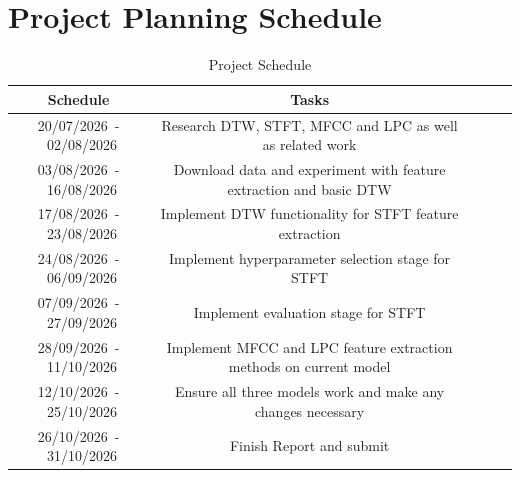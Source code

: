 \chapter{Project Planning Schedule}
\makeatletter{}\makeatother\label{appen:proj_plan}

\begin{table}[H]
    \caption{Project Schedule}
    \footnotesize
    \setlength{\tabcolsep}{3pt}
    \centering
    \begin{tabular}{ccccc}
        \toprule
        Schedule & Tasks \\
        \midrule
        20/07/2026~-~02/08/2026  & Research \acs{DTW}, \acs{STFT}, \acs{MFCC} and \acs{LPC} as well as related work \\
        03/08/2026~-~16/08/2026 & Download data and experiment with feature extraction and basic \acs{DTW} \\
        17/08/2026~-~23/08/2026 & Implement \acs{DTW} functionality for \acs{STFT} feature extraction \\
        24/08/2026~-~06/09/2026 & Implement hyperparameter selection stage for \acs{STFT} \\
        07/09/2026~-~27/09/2026 & Implement evaluation stage for \acs{STFT} \\
        28/09/2026~-~11/10/2026 & Implement \acs{MFCC} and \acs{LPC} feature extraction methods on current model \\
        12/10/2026~-~25/10/2026 & Ensure all three models work and make any changes necessary \\
        26/10/2026~-~31/10/2026 & Finish Report and submit \\
        \bottomrule
    \end{tabular}\label{tab:proj_sched}
\end{table}
